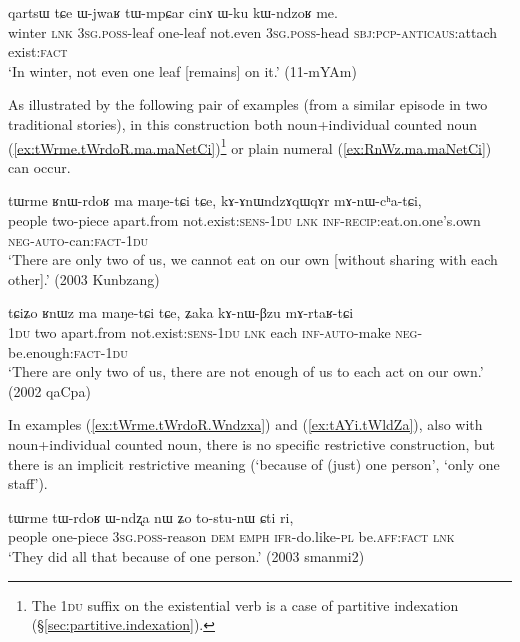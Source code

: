 \begin{exe}
	\ex \label{ex:Wjwaʁ.tWmpCar.cinA}
	\gll   qartsɯ tɕe ɯ-jwaʁ tɯ-mpɕar cinɤ ɯ-ku kɯ-ndzoʁ me.  \\
	winter \textsc{lnk} \textsc{3sg}.\textsc{poss}-leaf one-leaf not.even \textsc{3sg}.\textsc{poss}-head \textsc{sbj}:\textsc{pcp}-\textsc{anticaus}:attach exist:\textsc{fact} \\ 
	\glt `In winter, not even one leaf [remains] on it.' (11-mYAm)
\end{exe} 

As illustrated by the following pair of examples (from a similar episode in two traditional stories), in this construction both noun+individual counted noun  (\ref{ex:tWrme.tWrdoR.ma.maNetCi})\footnote{The \textsc{1du} suffix on the existential verb  is a case of partitive indexation (§\ref{sec:partitive.indexation}). }  or plain numeral (\ref{ex:RnWz.ma.maNetCi}) can occur.

\begin{exe}
	\ex \label{ex:tWrme.tWrdoR.ma.maNetCi}
	\gll tɯrme ʁnɯ-rdoʁ ma maŋe-tɕi tɕe, kɤ-ɤnɯndzɤqɯqɤr mɤ-nɯ-cʰa-tɕi, \\
	people two-piece apart.from not.exist:\textsc{sens}-\textsc{1du} \textsc{lnk} \textsc{inf}-\textsc{recip}:eat.on.one's.own \textsc{neg}-\textsc{auto}-can:\textsc{fact}-\textsc{1du} \\
	\glt `There are only two of us, we cannot eat on our own [without sharing with each other].' (2003 Kunbzang)
\end{exe} 

\begin{exe}
	\ex \label{ex:RnWz.ma.maNetCi}
	\gll  tɕiʑo ʁnɯz ma maŋe-tɕi tɕe, ʑaka kɤ-nɯ-βzu mɤ-rtaʁ-tɕi \\
	\textsc{1du} two apart.from not.exist:\textsc{sens}-\textsc{1du} \textsc{lnk} each \textsc{inf}-\textsc{auto}-make \textsc{neg}-be.enough:\textsc{fact}-\textsc{1du} \\
	\glt  `There are only two of us, there are not enough of us to each act on our own.' (2002 qaCpa)
\end{exe} 

In examples (\ref{ex:tWrme.tWrdoR.Wndzxa}) and (\ref{ex:tAYi.tWldZa}), also with noun+individual counted noun, there is no specific restrictive construction, but there is an implicit restrictive meaning (`because of (just) one person', `only one staff'). 

\begin{exe}
	\ex \label{ex:tWrme.tWrdoR.Wndzxa}
	\gll tɯrme tɯ-rdoʁ ɯ-ndʐa nɯ ʑo to-stu-nɯ ɕti ri, \\
	people one-piece  \textsc{3sg}.\textsc{poss}-reason \textsc{dem} \textsc{emph} \textsc{ifr}-do.like-\textsc{pl} be.\textsc{aff}:\textsc{fact} \textsc{lnk} \\
	\glt `They did all that because of one person.' (2003 smanmi2)
\end{exe} 

